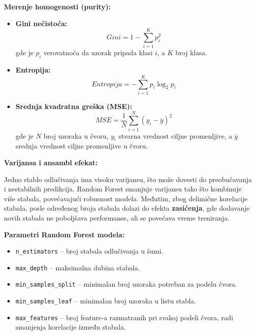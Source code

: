 \documentclass[12pt]{article}
\begin{document}
\textbf{Merenje homogenosti (purity):}

\begin{itemize}
    \item \textbf{Gini nečistoća:} 
    \begin{equation}
    Gini = 1 - \sum_{i=1}^{K} p_i^2
    \end{equation}
    gde je $p_i$ verovatnoća da uzorak pripada klasi $i$, a $K$ broj klasa.
    
    \item \textbf{Entropija:} 
    \begin{equation}
    Entropija = - \sum_{i=1}^{K} p_i \log_2 p_i
    \end{equation}
    
    \item \textbf{Srednja kvadratna greška (MSE):} 
    \begin{equation}
    MSE = \frac{1}{N} \sum_{i=1}^{N} (y_i - \bar{y})^2
    \end{equation}
    gde je $N$ broj uzoraka u čvoru, $y_i$ stvarna vrednost ciljne promenljive, a $\bar{y}$ srednja vrednost ciljne promenljive u čvoru.
\end{itemize}

\textbf{Varijansa i ansambl efekat:}

Jedno stablo odlučivanja ima visoku varijansu, što može dovesti do preobučavanja i nestabilnih predikcija. Random Forest smanjuje varijansu tako što kombinuje više stabala, povećavajući robusnost modela. Međutim, zbog delimične korelacije stabala, posle određenog broja stabala dolazi do efekta \textbf{zasićenja}, gde dodavanje novih stabala ne poboljšava performanse, ali se povećava vreme treniranja.

\textbf{Parametri Random Forest modela:}

\begin{itemize}
    \item \texttt{n\_estimators} -- broj stabala odlučivanja u šumi.
    \item \texttt{max\_depth} -- maksimalna dubina stabala.
    \item \texttt{min\_samples\_split} -- minimalan broj uzoraka potreban za podelu čvora.
    \item \texttt{min\_samples\_leaf} -- minimalan broj uzoraka u listu stabla.
    \item \texttt{max\_features} -- broj feature-a razmatranih pri svakoj podeli čvora, radi smanjenja korelacije između stabala.
\end{itemize}
\end{document}
